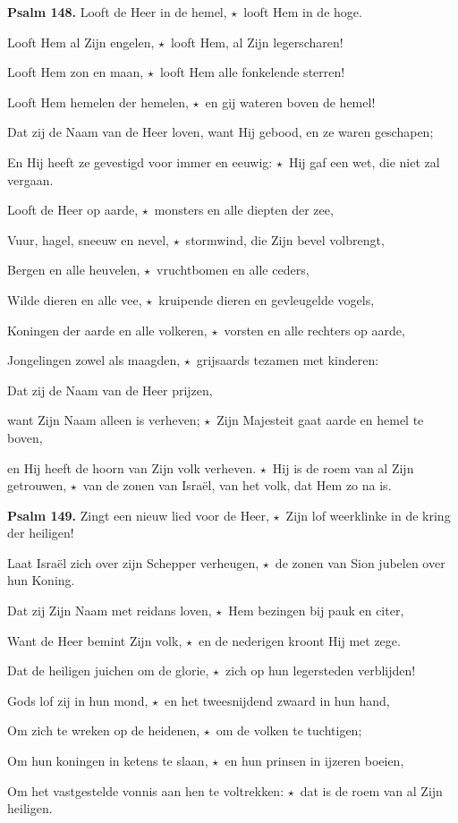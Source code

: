 \documentclass[12pt,twoside,a5paper]{article}
\newlength{\origparskip}
\newenvironment{halfparskip}{
  \setlength{\parskip}{0.5\origparskip}
}{
  \setlength{\parskip}{\origparskip}
}
\newcommand{\sep}{{\color{BrickRed} \textbf{$\star$}}}
\newcommand{\liturgicaloption}[1]{{\color{BrickRed}\textbf{#1}}}
\newcommand{\psalm}[1]{\liturgicaloption{Psalm #1.}}
\begin{document}
\begin{halfparskip}
  \psalm{148} Looft de Heer in de hemel, \sep\ looft Hem in de hoge.

  Looft Hem al Zijn engelen, \sep\ looft Hem, al Zijn legerscharen!

  Looft Hem zon en maan, \sep\ looft Hem alle fonkelende sterren!

  Looft Hem hemelen der hemelen, \sep\ en gij wateren boven de hemel!

  Dat zij de Naam van de Heer loven, want Hij gebood, en ze waren geschapen;

  En Hij heeft ze gevestigd voor immer en eeuwig: \sep\ Hij gaf een wet, die niet zal vergaan.

  Looft de Heer op aarde, \sep\ monsters en alle diepten der zee,

  Vuur, hagel, sneeuw en nevel, \sep\ stormwind, die Zijn bevel volbrengt,

  Bergen en alle heuvelen, \sep\ vruchtbomen en alle ceders,

  Wilde dieren en alle vee, \sep\ kruipende dieren en gevleugelde vogels,

  Koningen der aarde en alle volkeren, \sep\ vorsten en alle rechters op aarde,

  Jongelingen zowel als maagden, \sep\ grijsaards tezamen met kinderen:

  Dat zij de Naam van de Heer prijzen,

  want Zijn Naam alleen is verheven; \sep\ Zijn Majesteit gaat aarde en hemel te boven,

  en Hij heeft de hoorn van Zijn volk verheven. \sep\ Hij is de roem van al Zijn getrouwen, \sep\ van de zonen van
  Israël, van het volk, dat Hem zo na is.
\end{halfparskip}

\begin{halfparskip}
  \psalm{149} Zingt een nieuw lied voor de Heer, \sep\ Zijn lof weerklinke in de kring der heiligen!

  Laat Israël zich over zijn Schepper verheugen, \sep\ de zonen van Sion jubelen over hun Koning.

  Dat zij Zijn Naam met reidans loven, \sep\ Hem bezingen bij pauk en citer,

  Want de Heer bemint Zijn volk, \sep\ en de nederigen kroont Hij met zege.

  Dat de heiligen juichen om de glorie, \sep\ zich op hun legersteden verblijden!

  Gods lof zij in hun mond, \sep\ en het tweesnijdend zwaard in hun hand,

  Om zich te wreken op de heidenen, \sep\ om de volken te tuchtigen;

  Om hun koningen in ketens te slaan, \sep\ en hun prinsen in ijzeren boeien,

  Om het vastgestelde vonnis aan hen te voltrekken: \sep\ dat is de roem van al Zijn heiligen.
\end{halfparskip}
\end{document}
